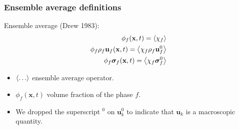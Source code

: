 \documentclass{sintefbeamer}
\begin{document}
\begin{frame}
  \frametitle{Ensemble average definitions}
Ensemble average (Drew 1983): 
\begin{align*}
  \phi_f (\textbf{x},t) = \left<\chi_f \right>\\
  \phi_f \rho_f  \textbf{u}_f (\textbf{x},t) = \left<\chi_f \rho_f \textbf{u}_f^0 \right>\\
  \phi_f \bm\sigma_f (\textbf{x},t) = \left<\chi_f \bm\sigma_f^0 \right>\\
  \label{eq:1_avg}
\end{align*}


\begin{definition}
  \begin{itemize}
    \item $\left<\ldots\right>$ ensemble average operator. 
    \item  $\phi_f (\textbf{x},t)$ volume fraction of the phase $f$. 
    \item We dropped the superscript $^0$ on $\textbf{u}^0_k$ to indicate that $\textbf{u}_k$ is a macroscopic quantity. 
  \end{itemize}
\end{definition}
\end{frame}
\end{document}
